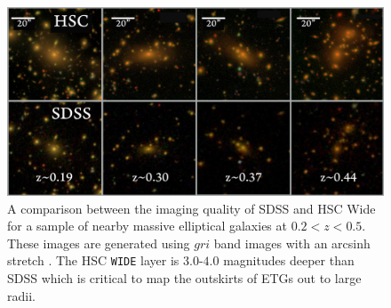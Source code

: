 \documentclass{emulateapj}
\begin{document}
\begin{CJK*}{UTF8}{gbsn}
\begin{abstract}
\end{abstract}

\maketitle


    \begin{figure}[t!]
        \centering 
        \includegraphics[width=\textwidth]{fig/redbcg_sdss_compare}
        \caption{
            A comparison between the imaging quality of SDSS and HSC Wide for a sample 
        	of nearby massive elliptical galaxies at $0.2 < z < 0.5$.  
            These images are generated using $gri$ band images with an arcsinh stretch 
            \citep{Lupton2004}. 
            The HSC \texttt{WIDE} layer is $3.0$-$4.0$ magnitudes deeper than SDSS 
            which is critical to map the outskirts of ETGs out to large radii.
            }
        \label{fig:sdss_compare}
    \end{figure}


\end{CJK*}
\end{document}
